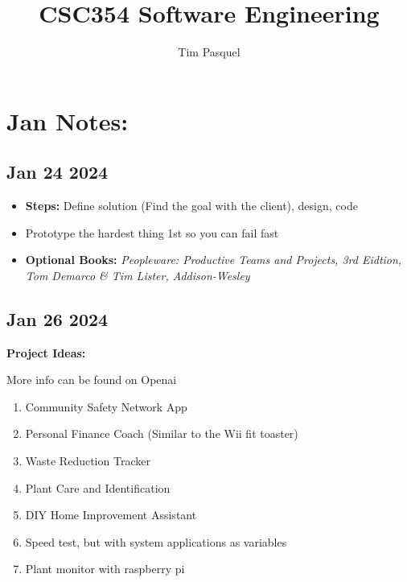 \documentclass[12pt]{article}
\author{Tim Pasquel}
\title{CSC354 Software Engineering}
\begin{document}
\maketitle

\titlepage

\section{Jan Notes:}

\subsection*{Jan 24 2024}

\begin{itemize}
		  \item \textbf{Steps:} Define solution (Find the goal with the client), design, code  
		  \item Prototype the hardest thing 1st so you can fail fast 
		  \item \textbf{Optional Books:} \it{Peopleware: Productive Teams and Projects, 3rd Eidtion, Tom Demarco \& Tim Lister, Addison-Wesley}
\end{itemize}

\subsection*{Jan 26 2024}

\textbf{Project Ideas:}

More info can be found on Openai

\begin{enumerate}
		  \item Community Safety Network App
		  \item Personal Finance Coach (Similar to the Wii fit toaster) 
		  \item Waste Reduction Tracker
		  \item Plant Care and Identification 
		  \item DIY Home Improvement Assistant 
		  \item Speed test, but with system applications as variables 
		  \item Plant monitor with raspberry pi 
\end{enumerate}
\end{document}
